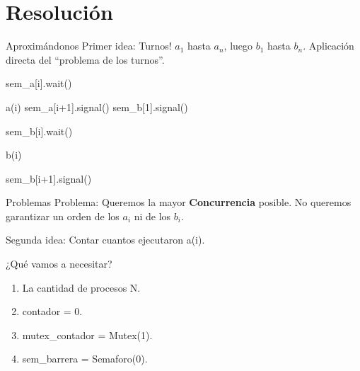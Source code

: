 \documentclass[pdf]{beamer}
\newcommand{\quotes}[1]{``#1''}
\begin{document}
\section{Resolución}
\begin{frame}{Aproximándonos}
    Primer idea: \pause Turnos! 
    \pause 
    \newline $a_1$ hasta $a_n$, luego $b_1$ hasta $b_n$.
    Aplicación directa del \quotes{problema de los turnos}.
    
    \vspace{1em}
    
    \pause
    \begin{algorithmic}
    
         
            \State sem\_a[i].wait()
            
            \vspace{0.5em}
            \State a(i)
            \vspace{0.5em}
             sem\_a[i+1].signal()
            \Else
            	\State sem\_b[1].signal()
            \EndIf
            \vspace{0.5em}
            
            \State sem\_b[i].wait()
            
            \vspace{0.5em}
            \State b(i)
            \vspace{0.5em}
            
            \State sem\_b[i+1].signal()
        
        \EndFunction
        
    \end{algorithmic}
    
    \pause
\end{frame}

\begin{frame}{Problemas}
    Problema: Queremos la mayor \textbf{Concurrencia} posible. 
    No queremos garantizar un orden de los $a_i$ ni de los $b_i$. 
    
    \vspace{2em}
    
    \pause
    
    Segunda idea: Contar cuantos ejecutaron a(i).
\end{frame}

\begin{frame}{¿Qué vamos a necesitar?}
    \begin{enumerate}
        \item La cantidad de procesos N.
        \item contador = 0.
        \item mutex\_contador = Mutex(1).
        \item sem\_barrera = Semaforo(0).
    \end{enumerate}
\end{frame}
\end{document}
